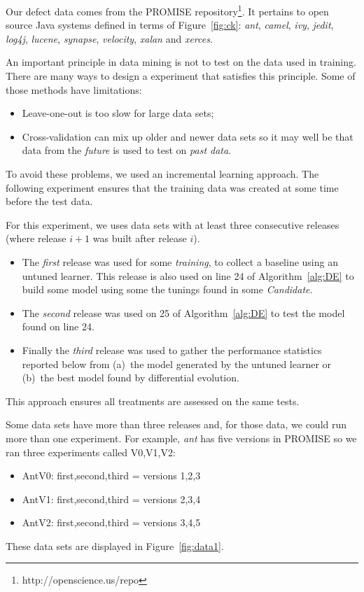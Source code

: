 \documentclass{sig-alternative}
\newcommand{\bi}{\begin{itemize}[leftmargin=0.4cm]}
\newcommand{\ei}{\end{itemize}}
\newcommand{\fig}[1]{Figure~\ref{fig:#1}}
\begin{document}
Our defect data comes from the PROMISE repository\footnote{http://openscience.us/repo}.
It pertains to 
open source Java systems defined in terms of \fig{ck}:  {\it ant}, {\it camel}, {\it ivy}, {\it jedit}, {\it log4j}, {\it lucene}, {\it 
synapse}, {\it velocity}, {\it xalan} and {\it xerces}. 

An important principle in data mining is not to test on the data used
in training.  There are many ways to design a experiment that satisfies this principle.
Some of those methods have  limitations:
\bi
\item  Leave-one-out is too slow for large data sets;
\item Cross-validation can mix up older and newer data sets so it may well be that
data from the {\em future} is used to test on {\em past data}.
\ei
To avoid these problems, we used an incremental learning approach. The following
experiment ensures that the training data was created at some time before the test
data.

For this experiment, we uses data sets with at least three  
consecutive releases  (where release $i+1$ was built after release $i$).
\bi 
\item The {\em first} release was used for some  {\em training}, to collect a baseline
   using an untuned learner. This release is also used  on line 24 of Algorithm~\ref{alg:DE} to
   build some model using some the tunings found in some {\em Candidate}.
   \item The {\em second} release was used on 25 of Algorithm~\ref{alg:DE} to 
   test the model found on line 24.
   \item Finally the {\em third} release was used to gather the performance statistics
   reported below from (a)~the model generated by the untuned learner or (b)~the
   best model found by differential evolution.
   \ei
This approach ensures   all treatments 
are assessed on the same tests.

Some data sets have more than three releases and, for those data, we could run more
 than one experiment. For example, {\em ant} has five versions in PROMISE so
 we ran three experiments called V0,V1,V2:
 \bi
 \item AntV0: first,second,third = versions 1,2,3
 \item AntV1: first,second,third = versions 2,3,4
 \item AntV2: first,second,third = versions 3,4,5
 \ei 
These data sets are displayed in \fig{data1}.
\end{document}
